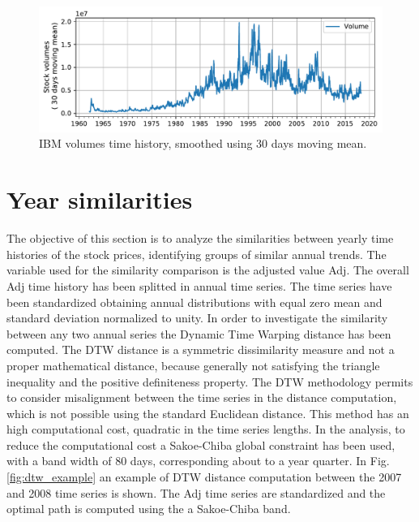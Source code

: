 \documentclass[a4paper,11pt,final]{article}
\begin{document}
\begin{figure}[htpb]
\center
\includegraphics[width= \linewidth]{figures/report_volumes_1.pdf}
\caption{IBM volumes time history, smoothed using 30 days moving mean.}
\label{fig:volumes}
\end{figure}


\section{Year similarities}

The objective of this section is to analyze the similarities between yearly time histories of the stock prices, identifying groups of similar annual trends.
The variable used for the similarity comparison is the adjusted value Adj. The overall Adj time history has been splitted in annual time series.
The time series have been standardized obtaining annual distributions with equal zero mean and standard deviation normalized to unity. 
In order to investigate the similarity between any two annual series the Dynamic Time Warping distance has been computed. 
The DTW distance is a symmetric dissimilarity measure and not a proper mathematical distance, because generally not satisfying the triangle inequality and the positive definiteness property.
The DTW methodology permits to consider misalignment between the time series in the distance computation, which is not possible using the standard Euclidean distance. This method has an high computational cost, quadratic in the time series lengths.
In the analysis, to reduce the computational cost a Sakoe-Chiba global constraint has been used, with a band width of 80 days, corresponding about to a year quarter.
In Fig. \ref{fig:dtw_example} an example of DTW distance computation between the 2007 and 2008 time series is shown. The Adj time series are standardized and the optimal path is computed using the a Sakoe-Chiba band.
\end{document}
